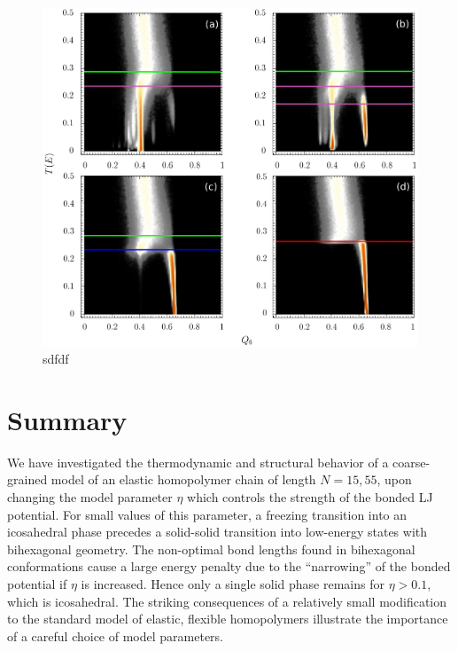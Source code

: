 \documentclass[12pt]{report}
\begin{document}
\begin{figure}
\center
\includegraphics[width=\textwidth]{chapter6Figs/structuralAnalysis55.eps}
	\caption{\label{fig:intensityPlots55}
     sdfdf}
\end{figure}



\section{Summary}
%
We have investigated the thermodynamic and structural behavior of a coarse-grained model of an elastic homopolymer chain of length $N=15,55$, upon changing the model parameter $\eta$ which controls the strength of the bonded LJ potential. For small values of this parameter, a freezing transition into an icosahedral phase precedes a solid-solid transition into low-energy states with bihexagonal geometry. The non-optimal bond lengths found in bihexagonal
conformations cause a large energy penalty due to the ``narrowing'' of the
bonded potential if $\eta$ is increased. Hence only a single
solid phase remains for $\eta > 0.1$, which is icosahedral. The striking
consequences of a relatively small modification to the standard model of
elastic, flexible homopolymers illustrate the importance of a careful
choice of model parameters.
\end{document}
